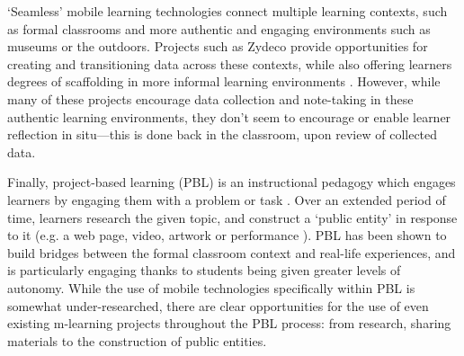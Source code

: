 `Seamless' mobile learning technologies connect multiple learning contexts, such as formal classrooms and more authentic and engaging environments such as museums or the outdoors. Projects such as Zydeco provide opportunities for creating and transitioning data across these contexts, while also offering learners degrees of scaffolding in more informal learning environments \citep{kuhn2011}. However, while many of these projects encourage data collection and note-taking in these authentic learning environments, they don't seem to encourage or enable learner reflection in situ---this is done back in the classroom, upon review of collected data.

Finally, project-based learning (PBL) is an instructional pedagogy which engages learners by engaging them with a problem or task \citep{Blumenfeld1991}. Over an extended period of time, learners research the given topic, and construct a `public entity' in response to it (e.g. a web page, video, artwork or performance \citep{Holubova2008}). PBL has been shown to build bridges between the formal classroom context and real-life experiences, and is particularly engaging thanks to students being given greater levels of autonomy. While the use of mobile technologies specifically within PBL is somewhat under-researched, there are clear opportunities for the use of even existing m-learning projects throughout the PBL process: from research, sharing materials to the construction of public entities.